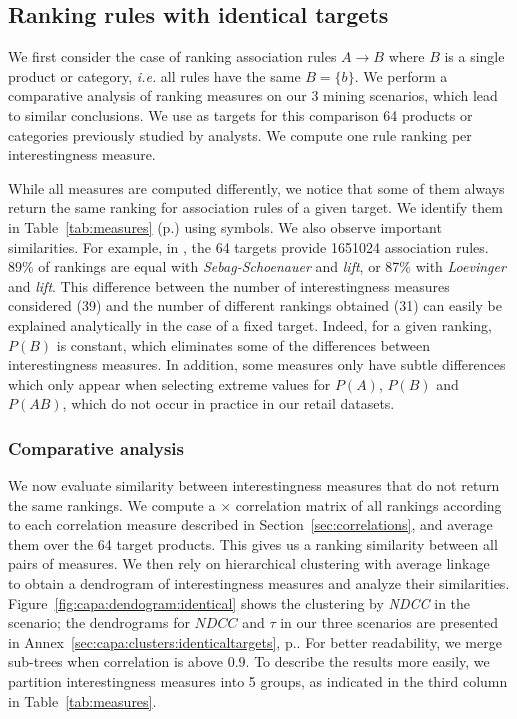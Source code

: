 



\subsection{Ranking rules with identical targets}
\label{sec:identicaltargets}
We first consider the case of ranking association rules $A\rightarrow B$ where $B$ is a single product or category,
{\em i.e.} all rules have the same $B=\{b\}$.
We perform a comparative analysis of ranking measures on our 3 mining scenarios,
which lead to similar conclusions.
We use as targets for this comparison 64 products or categories previously studied by analysts.
We compute one rule ranking per interestingness measure.

While all measures are computed differently,
we notice that some of them always return the  same ranking for association rules of a given target.
We identify them in Table~\ref{tab:measures} (p.\pageref{tab:measures}) using symbols.
We also observe important similarities.
For example, in \prodassocclient,
the 64 targets provide \num{1651024} association rules.
89\% of rankings are equal with {\em Sebag-Schoenauer} and {\em lift},
or 87\% with {\em Loevinger} and {\em lift}.
This difference between the number of interestingness measures considered (39)
and the number of different rankings obtained (31)
can easily be explained analytically in the case of a fixed target.
Indeed, for a given ranking, $P(B)$ is constant,
which eliminates some of the differences between interestingness measures.
In addition, some measures only have subtle differences which only appear when selecting extreme values
for $P(A)$, $P(B)$ and $P(AB)$, which do not occur in practice in our retail datasets.

\subsubsection{Comparative analysis}
We now evaluate similarity between interestingness measures that do not return the same rankings.
We compute a \nbm$\times$ \nbm correlation matrix of all rankings according to each correlation measure described in Section~\ref{sec:correlations},
and average them over the 64 target products.
This gives us a ranking similarity between all pairs of measures.
We then rely on hierarchical clustering with average linkage~\cite{sokal58}
to obtain a dendrogram of interestingness measures and analyze their similarities.
Figure~\ref{fig:capa:dendogram:identical} shows the clustering by {\em NDCC}
in the \demoassoc scenario;
the dendrograms for $\mathit{NDCC}$ and $\tau$ in our three scenarios are presented in
Annex~\ref{sec:capa:clusters:identicaltargets}, p.\pageref{sec:capa:clusters:identicaltargets}.
For better readability, we merge sub-trees when correlation is above $0.9$.
To describe the results more easily, we partition interestingness measures into 5 groups,
as indicated in the third column in Table~\ref{tab:measures}.


